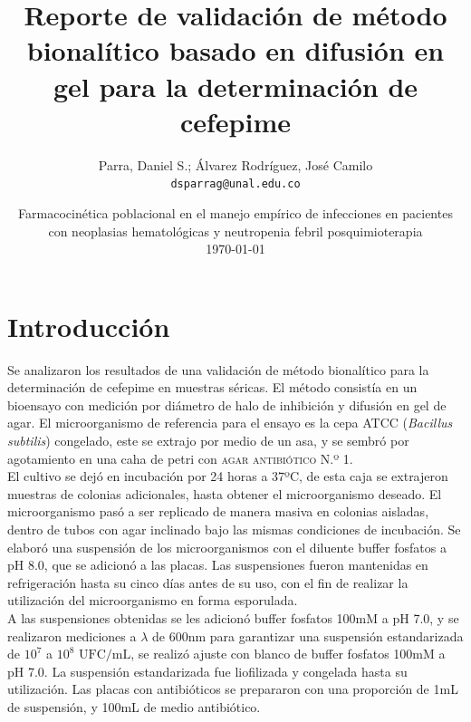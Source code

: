 \documentclass{article}
\title{Reporte de validación de método bionalítico basado en difusión en gel para la determinación de cefepime} %
\author{Parra, Daniel S.; Álvarez Rodríguez, José Camilo\\ \texttt{dsparrag@unal.edu.co}} %
\date{Farmacocinética poblacional en el manejo empírico 
	de infecciones en pacientes con neoplasias hematológicas y neutropenia febril posquimioterapia \\
	\today} %
\begin{document}
\maketitle %


\newcommand*{\UFCc}{\ensuremath{\mathrm{UFC/mL}}}
\newcommand*{\conc}{\ensuremath{\mathrm{\mu g/mL}}}

\section*{Introducción} \label{Introducción}
Se analizaron los resultados de una validación de método bionalítico para la determinación de cefepime en muestras séricas. El método consistía en un bioensayo con medición por diámetro de halo de inhibición y difusión en gel de agar. El microorganismo de referencia para el ensayo es la cepa ATCC (\textit{Bacillus subtilis}) congelado, este se extrajo por medio de un asa, y se sembró por agotamiento en una caha de petri con \textsc{agar antibiótico N.º 1}. \\

\noindent
El cultivo se dejó en incubación por 24 horas a 37ºC, de esta caja se extrajeron muestras de colonias adicionales, hasta obtener el microorganismo deseado. El microorganismo pasó a ser replicado de manera masiva en colonias aisladas, dentro de tubos con agar inclinado bajo las mismas condiciones de incubación. Se elaboró una suspensión de los microorganismos con el diluente buffer fosfatos a pH 8.0, que se adicionó a las placas. Las suspensiones fueron mantenidas en refrigeración hasta su cinco días antes de su uso, con el fin de realizar la utilización del microorganismo en forma esporulada. \\

\noindent
A las suspensiones obtenidas se les adicionó buffer fosfatos 100mM a pH 7.0, y se realizaron mediciones a $\lambda$ de 600nm para garantizar una suspensión estandarizada de $10^7$ a $10^8$ $\UFCc$, se realizó ajuste con blanco de buffer fosfatos 100mM a pH 7.0. La suspensión estandarizada fue liofilizada y congelada hasta su utilización. Las placas con antibióticos se prepararon con una proporción de 1mL de suspensión, y 100mL de medio antibiótico. \\
\end{document}
